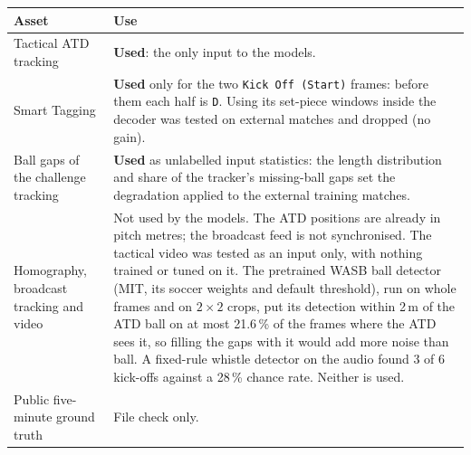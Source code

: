 \documentclass[10pt,a4paper]{article}
\newcommand{\code}[1]{\texttt{#1}}
\begin{document}
\begin{center}
\begin{tabularx}{\textwidth}{>{\raggedright\arraybackslash}p{4.2cm} L}
\toprule
Asset & Use \\
\midrule
Tactical ATD tracking & \textbf{Used}: the only input to the models. \\
Smart Tagging & \textbf{Used} only for the two \code{Kick Off (Start)} frames: before them each
  half is \code{D}. Using its set-piece windows inside the decoder was tested on external matches
  and dropped (no gain). \\
Ball gaps of the challenge tracking & \textbf{Used} as unlabelled input statistics: the length
  distribution and share of the tracker's missing-ball gaps set the degradation applied to the
  external training matches. \\
Homography, broadcast tracking and video & Not used by the models. The ATD positions are already in
  pitch metres; the broadcast feed is not synchronised. The tactical video was tested as an input
  only, with nothing trained or tuned on it. The pretrained WASB ball detector (MIT, its soccer
  weights and default threshold), run on whole frames and on $2\times2$ crops, put its detection within
  2\,m of the ATD ball on at most 21.6\,\% of the frames where the ATD sees it, so filling the gaps
  with it would add more noise than ball. A fixed-rule whistle detector on the audio found 3 of 6
  kick-offs against a 28\,\% chance rate. Neither is used. \\
Public five-minute ground truth & File check only. \\
\bottomrule
\end{tabularx}
\end{center}
\end{document}
